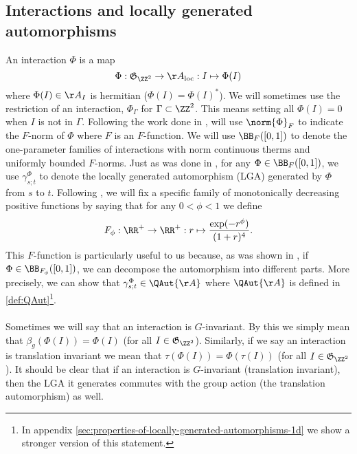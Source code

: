 \subsection{Interactions and locally generated automorphisms}\label{sec:Interactions}
An interaction $\Phi$ is a map
\begin{equation}
	\Phi: \mathfrak{G}_{\ZZ^2}\rightarrow \AA_{\text{loc}}: I \mapsto \Phi(I)
\end{equation}
where $\Phi(I)\in\AA_I$ is hermitian ($\Phi(I)=\Phi(I)^*$). We will sometimes use the restriction of an interaction, $\Phi_\Gamma$ for $\Gamma\subset\ZZ^2$. This means setting all $\Phi(I)=0$ when $I$ is not in $\Gamma$. Following the work done in \cite{nachtergaele2019quasi}, will use $\norm{\Phi}_F$ to indicate the $F$-norm of $\Phi$ where $F$ is an $F$-function. We will use $\BB_{F}([0,1])$ to denote the one-parameter families of interactions with norm continuous therms and uniformly bounded $F$-norms. Just as was done in \cite{nachtergaele2019quasi}, for any $\Phi\in \BB_{F}([0,1])$, we use $\gamma^{\Phi}_{s;t}$ to denote the locally generated automorphism (LGA) generated by $\Phi$ from $s$ to $t$. Following \cite{Ogata2d}, we will fix a specific family of monotonically decreasing positive functions by saying that for any $0<\phi<1$ we define
\begin{equation}\label{eq:OurFFunction}
	F_\phi:\RR^+\rightarrow\RR^+:r\mapsto \frac{\exp(-r^\phi)}{(1+r)^4}.
\end{equation}
This $F$-function is particularly useful to us because, as was shown in \cite{Ogata2d}, if $\Phi\in\BB_{F_\phi}([0,1])$, we can decompose the automorphism into different parts. More precisely, we can show that $\gamma^{\Phi}_{s;t}\in\QAut{\AA}$ where $\QAut{\AA}$ is defined in \ref{def:QAut}\footnote{In appendix \ref{sec:properties-of-locally-generated-automorphisms-1d} we show a stronger version of this statement.}.
\\\\
Sometimes we will say that an interaction is $G$-invariant. By this we simply mean that $\beta_g(\Phi(I))=\Phi(I)$ (for all $I\in\mathfrak{G}_{\ZZ^2}$). Similarly, if we say an interaction is translation invariant we mean that $\tau(\Phi(I))=\Phi(\tau(I))$ (for all $I\in\mathfrak{G}_{\ZZ^2}$). It should be clear that if an interaction is $G$-invariant (translation invariant), then the LGA it generates commutes with the group action (the translation automorphism) as well.
